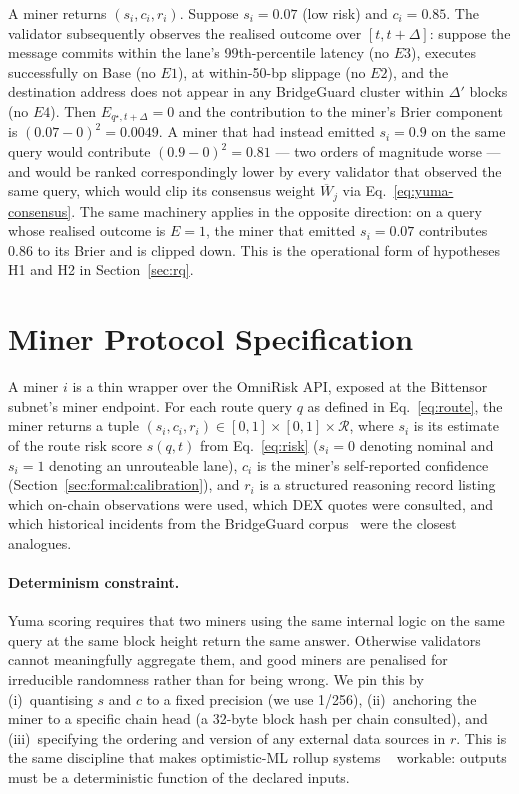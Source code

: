 \documentclass[11pt,a4paper]{article}
\begin{document}
A miner returns $(s_i, c_i, r_i)$. Suppose $s_i = 0.07$ (low risk) and $c_i = 0.85$.
The validator subsequently observes the realised outcome over $[t, t + \Delta]$:
suppose the message commits within the lane's 99th-percentile latency
(no $E3$), executes successfully on Base (no $E1$), at within-50-bp slippage
(no $E2$), and the destination address does not appear in any BridgeGuard cluster
within $\Delta'$ blocks (no $E4$). Then $E_{q^{\star}, t+\Delta} = 0$ and the contribution
to the miner's Brier component is $(0.07 - 0)^2 = 0.0049$. A miner that had instead
emitted $s_i = 0.9$ on the same query would contribute $(0.9 - 0)^2 = 0.81$ --- two
orders of magnitude worse --- and would be ranked correspondingly lower by every
validator that observed the same query, which would clip its consensus weight
$\overline{W}_j$ via Eq.~\eqref{eq:yuma-consensus}. The same machinery applies in the
opposite direction: on a query whose realised outcome is $E = 1$, the miner that emitted
$s_i = 0.07$ contributes $0.86$ to its Brier and is clipped down. This is the operational
form of hypotheses H1 and H2 in Section~\ref{sec:rq}.

\section{Miner Protocol Specification}\label{sec:miner}

A miner $i$ is a thin wrapper over the OmniRisk API, exposed at the Bittensor subnet's
miner endpoint. For each route query $q$ as defined in Eq.~\eqref{eq:route}, the miner
returns a tuple $(s_i, c_i, r_i) \in [0,1] \times [0,1] \times \mathcal{R}$, where
$s_i$ is its estimate of the route risk score $s(q,t)$ from Eq.~\eqref{eq:risk}
($s_i = 0$ denoting nominal and $s_i = 1$ denoting an unrouteable lane), $c_i$ is the
miner's self-reported confidence (Section~\ref{sec:formal:calibration}), and $r_i$ is a
structured reasoning record listing which on-chain observations were used, which DEX
quotes were consulted, and which historical incidents from the BridgeGuard
corpus~\cite{wu2025safeguarding} were the closest analogues.

\paragraph{Determinism constraint.} Yuma scoring requires that two miners using the
same internal logic on the same query at the same block height return the same answer.
Otherwise validators cannot meaningfully aggregate them, and good miners are penalised
for irreducible randomness rather than for being wrong. We pin this by (i)~quantising
$s$ and $c$ to a fixed precision (we use 1/256), (ii)~anchoring the miner to a specific
chain head (a 32-byte block hash per chain consulted), and (iii)~specifying the
ordering and version of any external data sources in $r$. This is the same discipline
that makes optimistic-ML rollup systems
~\cite{conway2024opml} workable: outputs must be a deterministic function of the
declared inputs.
\end{document}
